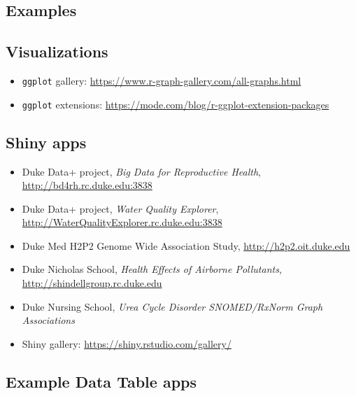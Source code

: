\documentclass[10pt, letterpaper]{article}
\begin{document}
\begin{spacing}{1.0}


\section{Examples}\label{sec:examples}

\subsection{Visualizations}\label{sec:examplevis}
\begin{itemize}
    \item \texttt{ggplot} gallery:  \url{https://www.r-graph-gallery.com/all-graphs.html}
    \item \texttt{ggplot} extensions:  \url{https://mode.com/blog/r-ggplot-extension-packages}
\end{itemize}

\subsection{Shiny apps}\label{sec:exampleapps}
\begin{itemize}
    \item Duke Data+ project, \textit{Big Data for Reproductive Health}, \url{http://bd4rh.rc.duke.edu:3838}
    \item Duke Data+ project, \textit{Water Quality Explorer}, \url{http://WaterQualityExplorer.rc.duke.edu:3838}
    \item Duke Med H2P2 Genome Wide Association Study, \url{http://h2p2.oit.duke.edu}
    \item Duke Nicholas School, \textit{Health Effects of Airborne Pollutants}, \url{http://shindellgroup.rc.duke.edu}
    \item Duke Nursing School, \textit{Urea Cycle Disorder SNOMED/RxNorm Graph Associations}
    \item Shiny gallery:  \url{https://shiny.rstudio.com/gallery/}
\end{itemize}

\subsection{Example Data Table apps}\label{sec:examplesDT}

\begin{itemize}
    

\end{itemize}
\end{spacing}
\end{document}
